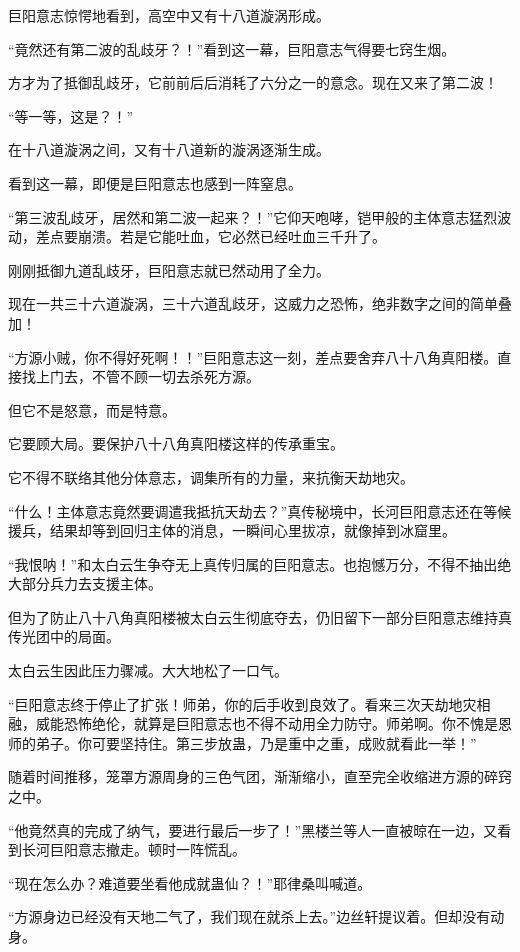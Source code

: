 \begin{this_body}
巨阳意志惊愕地看到，高空中又有十八道漩涡形成。

“竟然还有第二波的乱歧牙？！”看到这一幕，巨阳意志气得要七窍生烟。

方才为了抵御乱歧牙，它前前后后消耗了六分之一的意念。现在又来了第二波！

“等一等，这是？！”

在十八道漩涡之间，又有十八道新的漩涡逐渐生成。

看到这一幕，即便是巨阳意志也感到一阵窒息。

“第三波乱歧牙，居然和第二波一起来？！”它仰天咆哮，铠甲般的主体意志猛烈波动，差点要崩溃。若是它能吐血，它必然已经吐血三千升了。

刚刚抵御九道乱歧牙，巨阳意志就已然动用了全力。

现在一共三十六道漩涡，三十六道乱歧牙，这威力之恐怖，绝非数字之间的简单叠加！

“方源小贼，你不得好死啊！！”巨阳意志这一刻，差点要舍弃八十八角真阳楼。直接找上门去，不管不顾一切去杀死方源。

但它不是怒意，而是特意。

它要顾大局。要保护八十八角真阳楼这样的传承重宝。

它不得不联络其他分体意志，调集所有的力量，来抗衡天劫地灾。

“什么！主体意志竟然要调遣我抵抗天劫去？”真传秘境中，长河巨阳意志还在等候援兵，结果却等到回归主体的消息，一瞬间心里拔凉，就像掉到冰窟里。

“我恨呐！”和太白云生争夺无上真传归属的巨阳意志。也抱憾万分，不得不抽出绝大部分兵力去支援主体。

但为了防止八十八角真阳楼被太白云生彻底夺去，仍旧留下一部分巨阳意志维持真传光团中的局面。

太白云生因此压力骤减。大大地松了一口气。

“巨阳意志终于停止了扩张！师弟，你的后手收到良效了。看来三次天劫地灾相融，威能恐怖绝伦，就算是巨阳意志也不得不动用全力防守。师弟啊。你不愧是恩师的弟子。你可要坚持住。第三步放蛊，乃是重中之重，成败就看此一举！”

随着时间推移，笼罩方源周身的三色气团，渐渐缩小，直至完全收缩进方源的碎窍之中。

“他竟然真的完成了纳气，要进行最后一步了！”黑楼兰等人一直被晾在一边，又看到长河巨阳意志撤走。顿时一阵慌乱。

“现在怎么办？难道要坐看他成就蛊仙？！”耶律桑叫喊道。

“方源身边已经没有天地二气了，我们现在就杀上去。”边丝轩提议着。但却没有动身。


\end{this_body}
